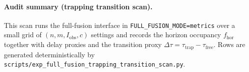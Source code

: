 \paragraph{Audit summary (trapping transition scan).} \AuditTag This scan runs the full-fusion interface in \texttt{FULL\_FUSION\_MODE=metrics} over a small grid of $(n,m,I_{\mathrm{obs}},c)$ settings and records the horizon occupancy $f_{\mathrm{hor}}$ together with delay proxies and the transition proxy $\Delta\tau=\tau_{\mathrm{trap}}-\tau_{\mathrm{free}}$. Rows are generated deterministically by \texttt{scripts/exp\_full\_fusion\_trapping\_transition\_scan.py}.